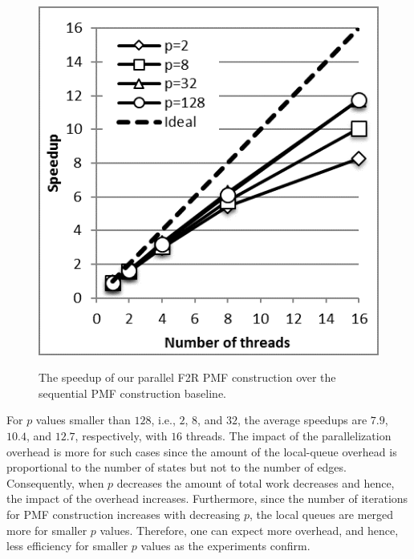 \documentclass[12pt]{article}
\begin{document}
\begin{figure}[ht]
{		\includegraphics[height=0.33\textheight]{figs/spF2R_8000.png}
	}
	\caption{The speedup of our parallel F2R PMF construction over the sequential PMF construction baseline.}
	\label{fig:f2r-speedup}
\end{figure}

For $p$ values smaller than $128$, i.e., $2$, $8$, and $32$, the average speedups are $7.9$, $10.4$,  and $12.7$, respectively, with $16$ threads. The impact of the parallelization overhead is more for such cases since the amount of the local-queue overhead is proportional to the number of states but not to the number of edges. Consequently, when $p$ decreases the amount of total work decreases and hence, the impact of the overhead increases. Furthermore, since the number of iterations for PMF construction increases with decreasing $p$, the local queues are merged more for smaller $p$ values. Therefore, one can expect more overhead, and hence, less efficiency for smaller $p$ values as the experiments confirm.
\end{document}
